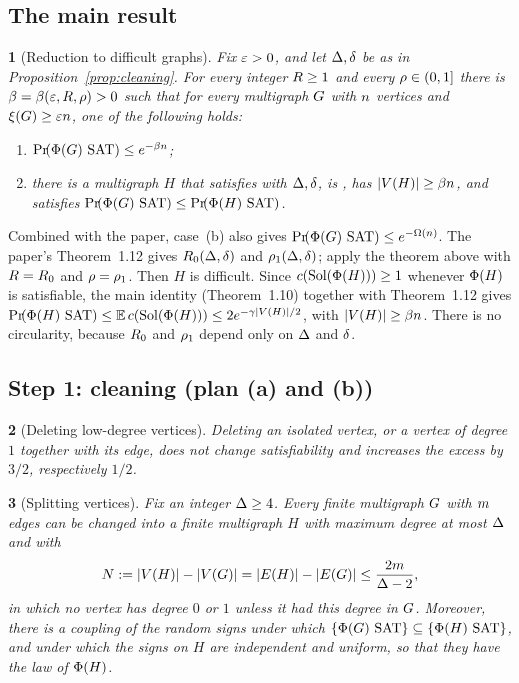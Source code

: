 \documentclass[11pt,a4paper]{article}
\theoremstyle{definition}
\theoremstyle{remark}
\theoremstyle{plain}
\newcommand{\restatedname}{}
\newtheorem*{restatedthm}{\restatedname}
\newenvironment{restate}[2]
  {\renewcommand{\restatedname}{#1}\begin{restatedthm}[#2]}
  {\end{restatedthm}}
\theoremstyle{definition}
\begin{document}
\subsection{The main result}

\begin{restate}{Theorem~\ref{thm:reduction}}{Reduction to difficult graphs}
Fix \(\varepsilon>0\), and let \(\Delta,\delta\) be as in
Proposition~\ref{prop:cleaning}. For every integer \(R\ge1\) and every
\(\rho\in(0,1]\) there is \(\beta=\beta(\varepsilon,R,\rho)>0\) such that for
every multigraph \(G\) with \(n\) vertices and \(\xi(G)\ge\varepsilon n\), one
of the following holds:
\begin{enumerate}[label=(\alph*)]
\item \(\Prx{\rform{\Gin}\SAT}\le e^{-\beta \nvert}\);
\item there is a multigraph \(H\) that satisfies \Hyp{} with
  \(\Delta,\delta\), is \loctree{\rad}{\nontree}, has
  \(|V(H)|\ge\beta n\), and satisfies
  \(\Prx{\rform{\Gin}\SAT}\le\Prx{\rform{H}\SAT}\).
\end{enumerate}
\end{restate}

\noindent Combined with the paper, case~(b) also gives
\(\Prx{\rform{\Gin}\SAT}\le e^{-\Omega(\nvert)}\). The paper's Theorem~1.12 gives
\(R_0(\Delta,\delta)\) and \(\rho_1(\Delta,\delta)\); apply the theorem above
with \(R=R_0\) and \(\rho=\rho_1\). Then \(H\) is difficult. Since
\(c(\operatorname{Sol}(\Phi(H)))\ge1\) whenever \(\Phi(H)\) is satisfiable,
the main identity (Theorem~1.10) together with Theorem~1.12 gives
\(\Prx{\rform{H}\SAT}\le\E\,\solcomp{\rform{H}}\le
2e^{-\rate|V(H)|/2}\), with \(|V(H)|\ge\beta n\). There is no circularity,
because \(R_0\) and \(\rho_1\) depend only on \(\Delta\) and \(\delta\).

\subsection{Step 1: cleaning (plan (a) and (b))}

\begin{restate}{Lemma~\ref{lem:leaf}}{Deleting low-degree vertices}
Deleting an isolated vertex, or a vertex of degree \(1\) together with its
edge, does not change satisfiability and increases the excess by \(3/2\),
respectively \(1/2\).
\end{restate}

\begin{restate}{Lemma~\ref{lem:splitting}}{Splitting vertices}
Fix an integer \(\Delta\ge4\). Every finite multigraph \(G\) with \(m\)
edges can be changed into a finite multigraph \(H\) with maximum degree at
most \(\Delta\) and with
\[
  N:=|V(H)|-|V(G)|=|E(H)|-|E(G)|\le\frac{2m}{\Delta-2},
\]
in which no vertex has degree \(0\) or \(1\) unless it had this degree in
\(G\). Moreover, there is a coupling of the random signs under which
\(\{\Phi(G)\text{ SAT}\}\subseteq\{\Phi(H)\text{ SAT}\}\), and under which the signs on
\(H\) are independent and uniform, so that they have the law of \(\Phi(H)\).
\end{restate}
\end{document}
